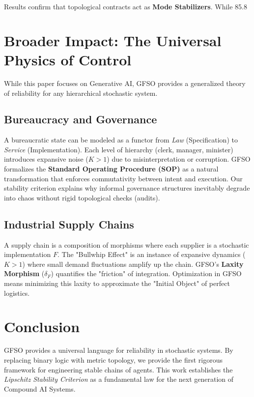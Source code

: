 \documentclass[11pt]{article}
\theoremstyle{definition}
\begin{document}
Results confirm that topological contracts act as \textbf{Mode Stabilizers}. While 85.8%

\section{Broader Impact: The Universal Physics of Control}
 While this paper focuses on Generative AI, GFSO provides a generalized theory of reliability for any hierarchical stochastic system.

\subsection{Bureaucracy and Governance}
 A bureaucratic state can be modeled as a functor from \textit{Law} (Specification) to \textit{Service} (Implementation). Each level of hierarchy (clerk, manager, minister) introduces expansive noise ($K > 1$) due to misinterpretation or corruption. GFSO formalizes the \textbf{Standard Operating Procedure (SOP)} as a natural transformation that enforces commutativity between intent and execution. Our stability criterion explains why informal governance structures inevitably degrade into chaos without rigid topological checks (audits).

\subsection{Industrial Supply Chains}
 A supply chain is a composition of morphisms where each supplier is a stochastic implementation $F$. The "Bullwhip Effect" is an instance of expansive dynamics ($K > 1$) where small demand fluctuations amplify up the chain. GFSO's \textbf{Laxity Morphism} ($\delta_F$) quantifies the "friction" of integration. Optimization in GFSO means minimizing this laxity to approximate the "Initial Object" of perfect logistics.

\section{Conclusion}
 GFSO provides a universal language for reliability in stochastic systems. By replacing binary logic with metric topology, we provide the first rigorous framework for engineering stable chains of agents. This work establishes the \textit{Lipschitz Stability Criterion} as a fundamental law for the next generation of Compound AI Systems.
\end{document}
